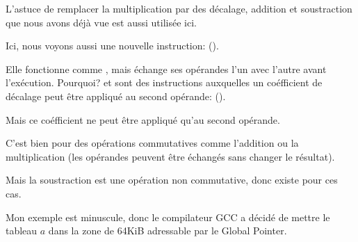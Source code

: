 L'astuce de remplacer la multiplication par des décalage, addition et soustraction
que nous avons déjà vue est aussi utilisée ici.

Ici, nous voyons aussi une nouvelle instruction: \RSB ().

Elle fonctionne comme \SUB, mais échange ses opérandes l'un avec l'autre avant l'exécution.
Pourquoi?
\SUB et \RSB sont des instructions auxquelles un coéfficient de décalage peut être
appliqué au second opérande: ().

Mais ce coéfficient ne peut être appliqué qu'au second opérande.

C'est bien pour des opérations commutatives comme l'addition ou la multiplication
(les opérandes peuvent être échangés sans changer le résultat).

Mais la soustraction est une opération non commutative, donc \RSB existe pour ces
cas.


Mon exemple est minuscule, donc le compilateur GCC a décidé de mettre le tableau
$a$ dans la zone de 64KiB adressable par le Global Pointer.



